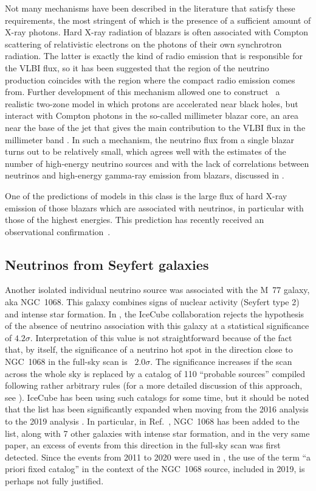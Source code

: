 \documentclass[a4paper,noshowpacs,noshowkeys,floatfix,twocolumn,preprintnumbers,nofootinbib]{revtex4-2}
\begin{document}
Not many mechanisms have been described in the literature that satisfy these requirements, the most stringent of which is the presence of a sufficient amount of X-ray photons. Hard X-ray radiation of blazars is often associated with Compton scattering of relativistic electrons on the photons of their own synchrotron radiation. The latter is exactly the kind of radio emission that is responsible for the VLBI flux, so it has been suggested \cite{neutradio2} that the region of the neutrino production coincides with the region where the compact radio emission comes from. Further development of this mechanism allowed one to construct~\cite{cores} a realistic two-zone model in which protons are accelerated near black holes, but interact with Compton photons in the so-called millimeter blazar core, an area near the base of the jet that gives the main contribution to the VLBI flux in the millimeter band \cite{Marscher}. In such a mechanism, the neutrino flux from a single blazar turns out to be relatively small, which agrees well with the estimates of the number of high-energy neutrino sources and with the lack of correlations between neutrinos and high-energy gamma-ray emission from blazars, discussed in \cite{ST-UFN}.

One of the predictions of models in this class is the large flux of hard X-ray emission of those blazars which are associated with neutrinos, in particular with those of the highest energies. This prediction has recently received an observational confirmation~\cite{neutxray}.


\subsection{Neutrinos from Seyfert galaxies}
\label{sec:extragal:Seyfert}
Another isolated individual neutrino source was associated with the M~77 galaxy, aka NGC~1068. This galaxy combines signs of nuclear activity (Seyfert type 2) and intense star formation. In \cite{IceCube-NGC1068}, the IceCube collaboration rejects the hypothesis of the absence of neutrino association with this galaxy at a statistical significance of $4.2\sigma$. Interpretation of this value is not straightforward because of the fact that, by itself, the significance of a neutrino hot spot in the direction close to NGC~1068 in the full-sky scan is~\cite{IceCube-NGC1068} $2.0\sigma$. The significance increases if the scan across the whole sky is replaced by a catalog of 110 ``probable sources'' compiled following rather arbitrary rules (for a more detailed discussion of this approach, see \cite{ST-UFN}). IceCube has been using such catalogs for some time, but it should be noted that the list has been significantly expanded when moving from the 2016 analysis \cite{IceCube7yrSources} to the 2019 analysis
\cite{IceCube-list2019}. In particular, in Ref.~\cite{IceCube-list2019}, NGC~1068 has been added to the list, along with 7 other galaxies with intense star formation, and in the very same paper, an excess of events from this direction in the full-sky scan was first detected. Since the events from 2011 to 2020 were used in \cite{IceCube-NGC1068}, the use of the term ``a priori fixed catalog'' in the context of the NGC~1068 source, included in 2019, is perhaps not fully justified.
\end{document}
